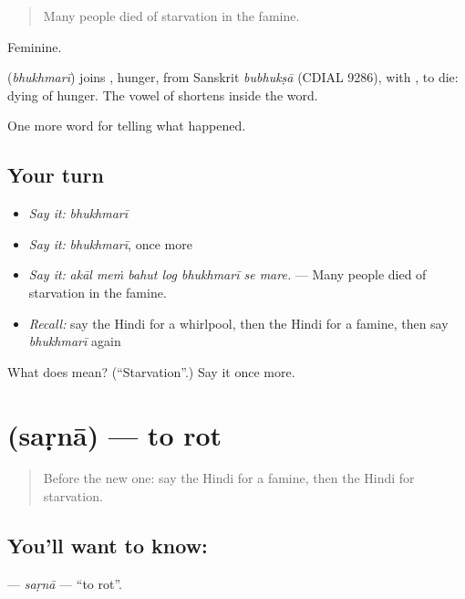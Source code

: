 \begin{quote}
Many people died of starvation in the famine.
\end{quote}

Feminine.

\begin{cousinweb}
\textbf{} (\emph{bhukhmarī}) joins \textbf{}, hunger, from Sanskrit \emph{bubhukṣā} (CDIAL 9286), with \textbf{}, to die: dying of hunger. The vowel of \textbf{} shortens inside the word.
\end{cousinweb}

\begin{grammarlens}[title={What you've built}]
One more word for telling what happened.
\end{grammarlens}

\subsection*{Your turn}
\begin{itemize}
\raggedright
  \item \emph{Say it:} \emph{bhukhmarī}
  \item \emph{Say it:} \emph{bhukhmarī}, once more
  \item \emph{Say it:} \emph{akāl meṁ bahut log bhukhmarī se mare.} — Many people died of starvation in the famine.
  \item \emph{Recall:} say the Hindi for a whirlpool, then the Hindi for a famine, then say \emph{bhukhmarī} again
\end{itemize}

\begin{tcolorbox}[breakable,colback=teal!4,colframe=teal!35!black,title={Before you move on}]
What does  mean? (\textquotedblleft{}Starvation\textquotedblright{}.) Say it once more.
\end{tcolorbox}
\section[\texorpdfstring{\hi{सड़ना} (saṛnā)}{सड़ना (saṛnā)}]{ (saṛnā) — to rot}

\label{lesson:HI-C306-sarna}



\begin{quote}
Before the new one: say the Hindi for a famine, then the Hindi for starvation.
\end{quote}

\subsection*{You'll want to know: }
\textbf{} — \emph{saṛnā} — \textquotedblleft{}to rot\textquotedblright{}.

